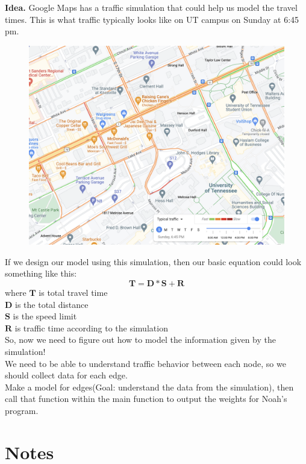 \documentclass{article}
\begin{document}
\newpage
\textbf{Idea.} Google Maps has a traffic simulation that could help us model the travel times. This is what traffic typically looks like on UT campus on Sunday at 6:45 pm. \\
\begin{figure}[htp]
\centering\includegraphics[width=5in]{Traffic Simulation 1.png}
\end{figure}

If we design our model using this simulation, then our basic equation could look something like this: \\
$$ \mathbold{T = D*S + R }$$  where
$\mathbold{T}$ is total travel time \\ $\mathbold{D}$ is the total distance \\ $\mathbold{S}$ is the speed limit \\ $\mathbold{R}$ is traffic time according to the simulation \\

So, now we need to figure out how to model the information given by the simulation! \\
We need to be able to understand traffic behavior between each node, so we should collect data for each edge.\\
Make a model for edges(Goal: understand the data from the simulation), then call that function within the main function to output the weights for Noah's program. 

\newpage
\section{Notes}
\end{document}
